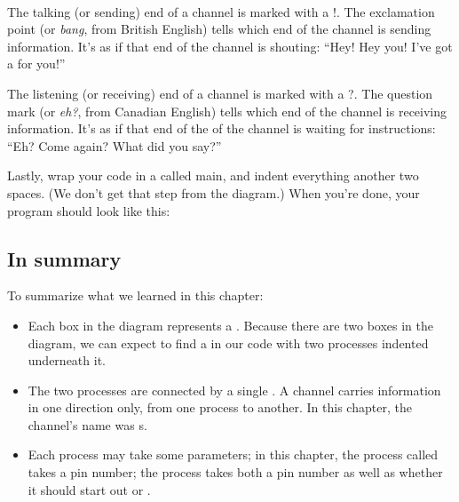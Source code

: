 \begin{figure}
\begin{center}
  \end{center}
\end{figure}

\ \\

\vspace{3mm}
The talking (or {\strong sending}) end of a channel is marked with a {\code !}. The exclamation point (or {\em bang}, from British English) tells \occam which end of the channel is sending information. It's as if that end of the channel is shouting: ``Hey! Hey you! I've got a \SIGNALV for you!''

\vspace{3mm}
The listening (or {\strong receiving}) end of a channel is marked with a {\code ?}. The question mark (or {\em eh?}, from Canadian English) tells \occam which end of the channel is receiving information. It's as if that end of the of the channel is waiting for instructions: ``Eh? Come again? What did you say?''

\clearpage
\newpage

Lastly, wrap your code in a \PROCedure called {\code main}, and indent everything another two spaces. (We don't get that step from the diagram.) When you're done, your program should look like this:

\vspace{3mm}


\subsection{In summary}

To summarize what we learned in this chapter:


\begin{itemize}
	\item Each box in the diagram represents a \PROCedure. Because there are two boxes in the diagram, we can expect to find a \PAR in our code with two processes indented underneath it. 
	\item The two processes are connected by a single \CHANnel. A channel carries information in one direction only, from one process to another. In this chapter, the channel's name was {\code s}.
	\item Each process may take some parameters; in this chapter, the process called \bp takes a pin number; the process \tp takes both a pin number as well as whether it should start out \LOW or \HIGH.
\end{itemize}


